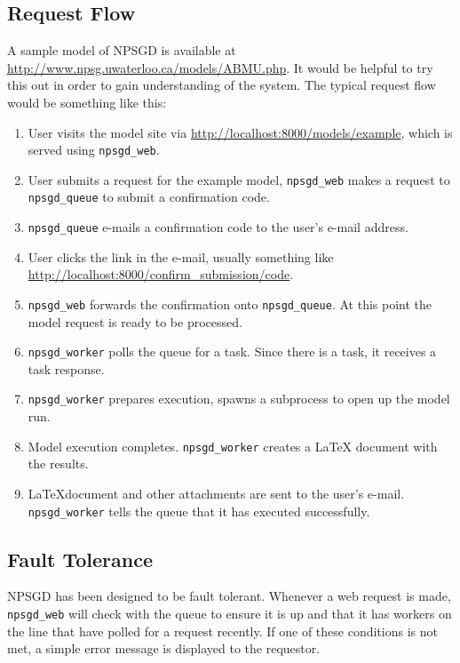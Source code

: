 \documentclass{article}
\begin{document}
\subsection{Request Flow}
A sample model of NPSGD is available at
\url{http://www.npsg.uwaterloo.ca/models/ABMU.php}. It would be helpful to try
this out in order to gain understanding of the system. The typical request flow
would be something like this:
\begin{enumerate}
    \item User visits the model site via \url{http://localhost:8000/models/example},
    which is served using \texttt{npsgd\_web}.

    \item User submits a request for the example model, \texttt{npsgd\_web} makes
    a request to \texttt{npsgd\_queue} to submit a confirmation code.

    \item \texttt{npsgd\_queue} e-mails a confirmation code to the user's e-mail
    address.
    
    \item User clicks the link in the e-mail, usually something like
    \url{http://localhost:8000/confirm\_submission/code}. 

    \item \texttt{npsgd\_web} forwards the confirmation onto
    \texttt{npsgd\_queue}. At this point the model request is ready to be
    processed.

    \item \texttt{npsgd\_worker} polls the queue for a task. Since there is a
    task, it receives a task response.

    \item \texttt{npsgd\_worker} prepares execution, spawns a subprocess to open
    up the model run. 
    
    \item Model execution completes. \texttt{npsgd\_worker} creates a \LaTeX
    document with the results.

    \item \LaTeX document and other attachments are sent to the user's e-mail.
    \texttt{npsgd\_worker} tells the queue that it has executed successfully.
\end{enumerate}

\subsection{Fault Tolerance}
NPSGD has been designed to be fault tolerant. Whenever a web request is made,
\texttt{npsgd\_web} will check with the queue to ensure it is up and that it has
workers on the line that have polled for a request recently. If one of these
conditions is not met, a simple error message is displayed to the requestor.
\end{document}
